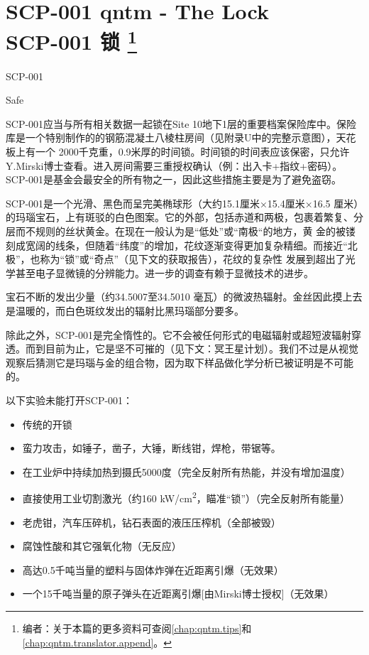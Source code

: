 \chapter[SCP-001 锁]{
	SCP-001 qntm - The Lock \\ 
	SCP-001 锁
	\protect\footnote{
		编者\QIS ：关于本篇的更多资料可查阅\autoref{chap:qntm.tips}和\autoref{chap:qntm.translator.append}。
	}
}

\label{chap:SCP-001.the.lock}

SCP-001

Safe

SCP-001应当与所有相关数据一起锁在Site 10地下1层的重要档案保险库中。保险库是一个特别制作的的钢筋混凝土八棱柱房间（见附录U中的完整示意图），天花板上有一个 2000千克重，0.9米厚的时间锁。时间锁的时间表应该保密，只允许Y.Mirski博士查看。进入房间需要三重授权确认（例：出入卡+指纹+密码）。SCP-001是基金会最安全的所有物之一，因此这些措施主要是为了避免盗窃。

SCP-001是一个光滑、黑色而呈完美椭球形（大约15.1厘米×15.4厘米×16.5 厘米）的玛瑙宝石，上有斑驳的白色图案。它的外部，包括赤道和两极，包裹着繁复、分层而不规则的丝状黄金。在现在一般认为是“低处”或“南极“的地方，黄 金的被镂刻成宽阔的线条，但随着“纬度”的增加，花纹逐渐变得更加复杂精细。而接近“北极”，也称为“锁”或“奇点”（见下文的获取报告），花纹的复杂性 发展到超出了光学甚至电子显微镜的分辨能力。进一步的调查有赖于显微技术的进步。

宝石不断的发出少量（约34.5007至34.5010 毫瓦）的微波热辐射。金丝因此摸上去是温暖的，而白色斑纹发出的辐射比黑玛瑙部分要多。

除此之外，SCP-001是完全惰性的。它不会被任何形式的电磁辐射或超短波辐射穿透。而到目前为止，它是坚不可摧的（见下文：冥王星计划）。我们不过是从视觉观察后猜测它是玛瑙与金的组合物，因为取下样品做化学分析已被证明是不可能的。


以下实验未能打开SCP-001：

\begin{itemize}
\item 传统的开锁
\item 蛮力攻击，如锤子，凿子，大锤，断线钳，焊枪，带锯等。
\item 在工业炉中持续加热到摄氏5000度（完全反射所有热能，并没有增加温度）
\item 直接使用工业切割激光（约160 kW\slash cm\textsuperscript{2}，瞄准“锁”）（完全反射所有能量）
\item 老虎钳，汽车压碎机，钻石表面的液压压榨机（全部被毁）
\item 腐蚀性酸和其它强氧化物（无反应）
\item 高达0.5千吨当量的塑料与固体炸弹在近距离引爆（无效果）
\item 一个15千吨当量的原子弹头在近距离引爆[由Mirski博士授权]（无效果）
\end{itemize}


